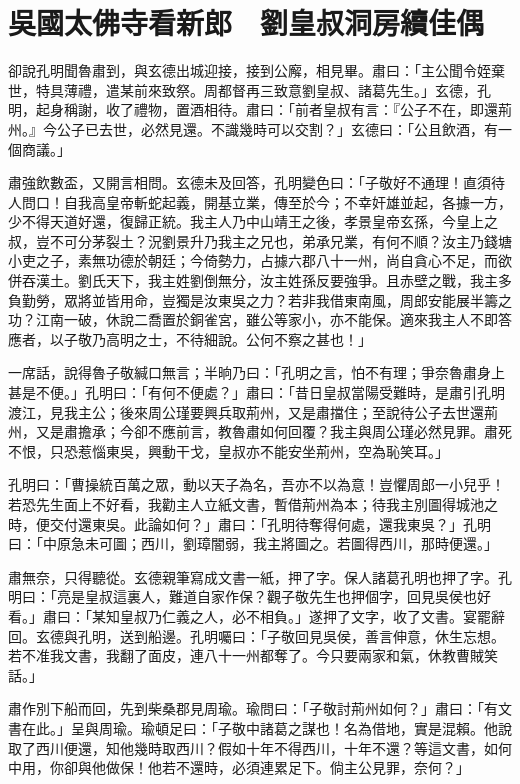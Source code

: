 
\chapter{吳國太佛寺看新郎　劉皇叔洞房續佳偶}

卻說孔明聞魯肅到，與玄德出城迎接，接到公廨，相見畢。肅曰：「主公聞令姪棄世，特具薄禮，遣某前來致祭。周都督再三致意劉皇叔、諸葛先生。」玄德，孔明，起身稱謝，收了禮物，置酒相待。肅曰：「前者皇叔有言：『公子不在，即還荊州。』今公子已去世，必然見還。不識幾時可以交割？」玄德曰：「公且飲酒，有一個商議。」

肅強飲數盃，又開言相問。玄德未及回答，孔明變色曰：「子敬好不通理！直須待人問口！自我高皇帝斬蛇起義，開基立業，傳至於今；不幸奸雄並起，各據一方，少不得天道好還，復歸正統。我主人乃中山靖王之後，孝景皇帝玄孫，今皇上之叔，豈不可分茅裂土？況劉景升乃我主之兄也，弟承兄業，有何不順？汝主乃錢塘小吏之子，素無功德於朝廷；今倚勢力，占據六郡八十一州，尚自貪心不足，而欲併吞漢土。劉氏天下，我主姓劉倒無分，汝主姓孫反要強爭。且赤壁之戰，我主多負勤勞，眾將並皆用命，豈獨是汝東吳之力？若非我借東南風，周郎安能展半籌之功？江南一破，休說二喬置於銅雀宮，雖公等家小，亦不能保。適來我主人不即答應者，以子敬乃高明之士，不待細說。公何不察之甚也！」

一席話，說得魯子敬緘口無言；半晌乃曰：「孔明之言，怕不有理；爭奈魯肅身上甚是不便。」孔明曰：「有何不便處？」肅曰：「昔日皇叔當陽受難時，是肅引孔明渡江，見我主公；後來周公瑾要興兵取荊州，又是肅擋住；至說待公子去世還荊州，又是肅擔承；今卻不應前言，教魯肅如何回覆？我主與周公瑾必然見罪。肅死不恨，只恐惹惱東吳，興動干戈，皇叔亦不能安坐荊州，空為恥笑耳。」

孔明曰：「曹操統百萬之眾，動以天子為名，吾亦不以為意！豈懼周郎一小兒乎！若恐先生面上不好看，我勸主人立紙文書，暫借荊州為本；待我主別圖得城池之時，便交付還東吳。此論如何？」肅曰：「孔明待奪得何處，還我東吳？」孔明曰：「中原急未可圖；西川，劉璋闇弱，我主將圖之。若圖得西川，那時便還。」

肅無奈，只得聽從。玄德親筆寫成文書一紙，押了字。保人諸葛孔明也押了字。孔明曰：「亮是皇叔這裏人，難道自家作保？觀子敬先生也押個字，回見吳侯也好看。」肅曰：「某知皇叔乃仁義之人，必不相負。」遂押了文字，收了文書。宴罷辭回。玄德與孔明，送到船邊。孔明囑曰：「子敬回見吳侯，善言伸意，休生忘想。若不准我文書，我翻了面皮，連八十一州都奪了。今只要兩家和氣，休教曹賊笑話。」

肅作別下船而回，先到柴桑郡見周瑜。瑜問曰：「子敬討荊州如何？」肅曰：「有文書在此。」呈與周瑜。瑜頓足曰：「子敬中諸葛之謀也！名為借地，實是混賴。他說取了西川便還，知他幾時取西川？假如十年不得西川，十年不還？等這文書，如何中用，你卻與他做保！他若不還時，必須連累足下。倘主公見罪，奈何？」

